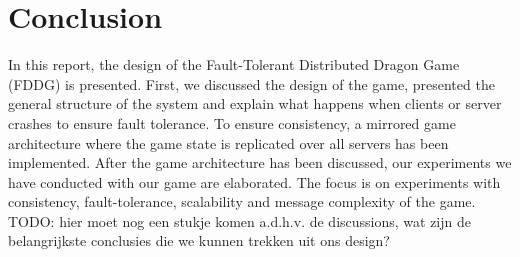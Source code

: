 \section{Conclusion}
In this report, the design of the Fault-Tolerant Distributed Dragon Game (FDDG) is presented. First, we discussed the design of the game, presented the general structure of the system and explain what happens when clients or server crashes to ensure fault tolerance. To ensure consistency, a mirrored game architecture where the game state is replicated over all servers has been implemented. After the game architecture has been discussed, our experiments we have conducted with our game are elaborated. The focus is on experiments with consistency, fault-tolerance, scalability and message complexity of the game.\\
TODO: hier moet nog een stukje komen a.d.h.v. de discussions, wat zijn de belangrijkste conclusies die we kunnen trekken uit ons design?